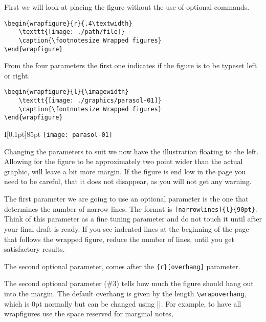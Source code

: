 First we will look at placing the figure without the use of optional commands.


\begin{verbatim}
\begin{wrapfigure}{r}{.4\textwidth}
    \texttt{[image: ./path/file]}
    \caption{\footnotesize Wrapped figures}
\end{wrapfigure}
\end{verbatim}

From the four parameters the first one indicates if the figure is to be typeset left or right.

\begin{verbatim}
\begin{wrapfigure}{l}{\imagewidth}
    \texttt{[image: ./graphics/parasol-01]}
    \caption{\footnotesize Wrapped figures}
\end{wrapfigure}
\end{verbatim}


\begin{wrapfigure}[16]{I}[0.1pt]{85pt}
    \relax
    \texttt{[image: parasol-01]}
    \caption{\scriptsize Wrapped figures, parameters set at \texttt\{l\}\{90pt\}.}
\end{wrapfigure}

Changing the parameters to suit we now have the illustration floating to the left. Allowing for the figure to be approximately two point  wider than the actual graphic, will leave a bit more margin. If the figure is end low in the page you need to be careful, that it does not disappear, as you will not get any warning.

The first parameter we are going to use an optional parameter is the one that determines the number of narrow lines. The format is \verb+[narrowlines]{l}{90pt}+. Think of this parameter as a fine tuning parameter and do not touch it until after your final draft is ready. If you see indented lines at the beginning of the page that follows the wrapped figure, reduce the number of lines, until you get satisfactory results.

The second optional parameter, comes after the \texttt{\{r\}[overhang]} parameter.

The second optional parameter (\#3) tells how much the figure should hang out into
the margin. The default overhang is given by the length \verb+\wrapoverhang+, which is 0pt
normally but can be changed using |\setlength|. For example, to have all wrapfigures
use the space reserved for marginal notes,


